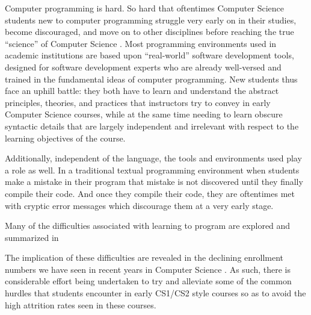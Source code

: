 \label{chapter:introduction}

Computer programming is hard.  So hard that oftentimes Computer Science students new to computer programming struggle
very early on in their studies, become discouraged, and move on to other disciplines before reaching the true ``science'' of Computer Science \cite{Beaubouef05}.  Most programming environments used in academic institutions are based upon ``real-world'' software development tools, designed for software development experts who are already well-versed and trained in the fundamental ideas of computer programming.  New students thus face an uphill battle: they both have to learn and understand the abstract principles, theories, and practices that instructors try to convey in early Computer Science courses, while at the same time needing to learn obscure syntactic details that are largely independent and irrelevant with respect to the learning objectives of the course.

Additionally, independent of the language, the tools and environments used play a role as well.  In a traditional textual programming environment when students make a mistake in their program that mistake is not discovered until they finally compile their code.  And once they compile their code, they are oftentimes met with cryptic error messages which discourage them at a very early stage.  

Many of the difficulties associated with learning to program are explored and summarized in \cite{jenkins02,Hundhausen09,Kelleher05}

The implication of these difficulties are revealed in the declining enrollment numbers we have seen in recent years in Computer Science \cite{Manaris07,Vesgo07,Ward08,Bayliss09}.  As such, there is considerable effort being undertaken to try and alleviate some of the common hurdles that students encounter in early CS1/CS2 style courses so as to avoid the high attrition rates seen in these courses.


